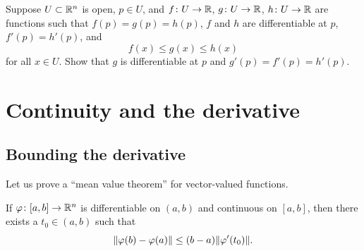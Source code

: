 \begin{exercise}
Suppose $U \subset {\mathbb{R}}^n$ is open, $p \in U$, and
$f \colon U \to {\mathbb{R}}$,
$g \colon U \to {\mathbb{R}}$,
$h \colon U \to {\mathbb{R}}$ are functions such that
$f(p) = g(p) = h(p)$, $f$ and $h$ are differentiable at $p$,
$f'(p) = h'(p)$, and
\begin{equation*}
f(x) \leq g(x) \leq h(x)
\end{equation*}
for all $x \in U$.  Show that $g$ is differentiable at $p$ and 
$g'(p) = f'(p) = h'(p)$.
\end{exercise}


\sectionnewpage
\section{Continuity and the derivative}
\label{sec:svthedercont}


\subsection{Bounding the derivative}

Let us prove a ``mean value theorem'' for vector-valued functions.

\begin{lemma}
If $\varphi \colon [a,b] \to {\mathbb{R}}^n$ is differentiable on $(a,b)$ and
continuous on $[a,b]$, then there exists a $t_0 \in (a,b)$ such that
\begin{equation*}
\lVert {\varphi(b)-\varphi(a)} \rVert \leq (b-a) \lVert {\varphi'(t_0)} \rVert .
\end{equation*}
\end{lemma}

